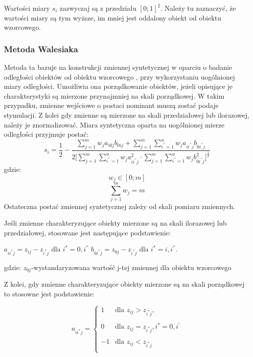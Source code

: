 \documentclass[12pt,a4paper]{report}
\begin{document}
Wartości miary $s_{i}$ zazwyczaj są z przedziału $[0; 1]^2$. Należy tu zaznaczyć, że wartości miary są tym wyższe, im mniej jest oddalony obiekt od obiektu wzorcowego. 

\subsubsection{Metoda Walesiaka}
\noindent


Metoda ta bazuje na konstrukcji zmiennej syntetycznej w oparciu o badanie odległości obiektów od obiektu wzorcowego , przy wykorzystaniu uogólnionej miary odległości. Umożliwia ona  porządkowanie obiektów, jeżeli opisujące je charakterystyki są mierzone przynajmniej na skali porządkowej. W takim przypadku, zmienne wejściowe o postaci nominant muszą zostać podaje stymulacji. Z kolei gdy zmienne są mierzone na skali przedziałowej lub ilorazowej, należy je znormalizować. 
Miara syntetyczna oparta na uogólnionej mierze odległości przyjmuje postać:
\begin{equation}
s_i=\frac{1}{2}-\frac{\sum_{j=1}^{m} w_{j}a_{i0j}b_{0ij} + \sum_{j=1}^{m}\sum_{i^{''}=1}^{n} w_{j}a_{ii^{''}j}b_{0i^{''}j}}{2\bigg[\sum_{j=1}^{m}\sum_{i^{''}=1}^{n} w_{j}a^{2}_{ii^{''}j} \cdot \sum_{j=1}^{m}\sum_{i^{''}=1}^{n} w_{j}b^{2}_{0i^{''}j} \bigg]^{\frac{1}{2} }}
\end{equation}
gdzie:
$$w_{j} \in [0; m]$$
$$\sum_{j=1}^{m} w_{j}=m$$
\newline
Ostateczna postać zmiennej syntetycznej zależy od skali pomiaru zmiennych. 

Jeśli zmienne charakteryzujące obiekty mierzone są na skali ilorazowej lub przedziałowej, stosowane jest następujące podstawienie:
\begin{center}
$a_{ii^{*}j}=z_{ij} - z_{i^{*}j}$ dla $i^{*}=0,i^{''}$
$b_{0i^{*}j}=z_{0j}-z_{i^*j}$ dla $i^{*}=i,i^{''}$.
\end{center}
gdzie:
\newline
$z_{0j}$-wystandaryzowana wartość j-tej zmiennej dla obiektu wzorcowego

Z kolei, gdy zmienne charakteryzujące obiekty mierzone są na skali porządkowej to stosowne jest podstawienie:

\begin{equation}
a_{ii^{*}j}=\left\{ \begin{array}{lll}
1  & \textrm{dla  } z_{ij}>z_{i^{*}j},\\\\
0 & \textrm{dla } z_{ij}=z_{i^{*}j}, i^{*}=0,i^{'}\\\\
-1 & \textrm{dla } z_{ij}<z_{i^{*}j}\\
\end{array} \right.
\end{equation}
\end{document}
